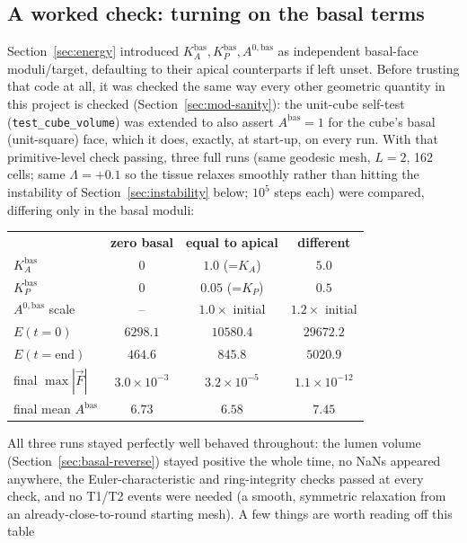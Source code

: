 \documentclass[11pt,a4paper]{report}
\begin{document}
\subsection{A worked check: turning on the basal terms}
\label{sec:basal-benchmark}
Section~\ref{sec:energy} introduced $K_A^{\mathrm{bas}}, K_P^{\mathrm{bas}},
A^{0,\mathrm{bas}}$ as independent basal-face moduli/target, defaulting
to their apical counterparts if left unset. Before trusting that code
at all, it was checked the same way every other geometric quantity in
this project is checked (Section~\ref{sec:mod-sanity}): the unit-cube
self-test (\texttt{test\_cube\_volume}) was extended to also assert
$A^{\mathrm{bas}}=1$ for the cube's basal (unit-square) face, which it
does, exactly, at start-up, on every run. With that primitive-level
check passing, three full runs (same geodesic mesh, $L=2$, 162 cells;
same $\Lambda=+0.1$ so the tissue relaxes smoothly rather than hitting
the instability of Section~\ref{sec:instability} below; $10^5$ steps
each) were compared, differing only in the basal moduli:
\begin{center}
\begin{tabular}{@{}lccc@{}}
\toprule
 & \textbf{zero basal} & \textbf{equal to apical} & \textbf{different} \\
$K_A^{\mathrm{bas}}$ & $0$ & $1.0$ (=$K_A$) & $5.0$ \\
$K_P^{\mathrm{bas}}$ & $0$ & $0.05$ (=$K_P$) & $0.5$ \\
$A^{0,\mathrm{bas}}$ scale & -- & $1.0\times$ initial & $1.2\times$ initial \\
\midrule
$E(t{=}0)$                 & $6298.1$ & $10580.4$ & $29672.2$ \\
$E(t{=}\mathrm{end})$      & $464.6$  & $845.8$   & $5020.9$ \\
final $\max|\vec F|$       & $3.0\times10^{-3}$ & $3.2\times10^{-5}$ & $1.1\times10^{-12}$ \\
final mean $A^{\mathrm{bas}}$ & $6.73$ & $6.58$ & $7.45$ \\
\bottomrule
\end{tabular}
\end{center}
All three runs stayed perfectly well behaved throughout: the
lumen volume (Section~\ref{sec:basal-reverse}) stayed positive the
whole time, no NaNs appeared anywhere, the Euler-characteristic and
ring-integrity checks passed at every check, and no T1/T2 events were
needed (a smooth, symmetric relaxation from an already-close-to-round
starting mesh). A few things are worth reading off this table
\end{document}
